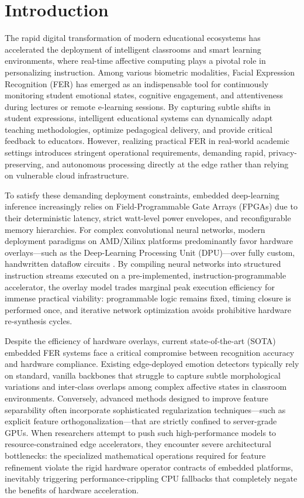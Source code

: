 \documentclass[algorithms,article,submit,moreauthors]{Definitions/mdpi}
\begin{document}
\section{Introduction}\label{sec1}

The rapid digital transformation of modern educational ecosystems has accelerated the deployment of intelligent classrooms and smart learning environments, where real-time affective computing plays a pivotal role in personalizing instruction. Among various biometric modalities, Facial Expression Recognition (FER) has emerged as an indispensable tool for continuously monitoring student emotional states, cognitive engagement, and attentiveness during lectures or remote e-learning sessions. By capturing subtle shifts in student expressions, intelligent educational systems can dynamically adapt teaching methodologies, optimize pedagogical delivery, and provide critical feedback to educators. However, realizing practical FER in real-world academic settings introduces stringent operational requirements, demanding rapid, privacy-preserving, and autonomous processing directly at the edge rather than relying on vulnerable cloud infrastructure.

To satisfy these demanding deployment constraints, embedded deep-learning inference increasingly relies on Field-Programmable Gate Arrays (FPGAs) due to their deterministic latency, strict watt-level power envelopes, and reconfigurable memory hierarchies. For complex convolutional neural networks, modern deployment paradigms on AMD/Xilinx platforms predominantly favor hardware overlays—such as the Deep-Learning Processing Unit (DPU)—over fully custom, handwritten dataflow circuits \citep{bib2,bib1}. By compiling neural networks into structured instruction streams executed on a pre-implemented, instruction-programmable accelerator, the overlay model trades marginal peak execution efficiency for immense practical viability: programmable logic remains fixed, timing closure is performed once, and iterative network optimization avoids prohibitive hardware re-synthesis cycles.

Despite the efficiency of hardware overlays, current state-of-the-art (SOTA) embedded FER systems face a critical compromise between recognition accuracy and hardware compliance. Existing edge-deployed emotion detectors typically rely on standard, vanilla backbones that struggle to capture subtle morphological variations and inter-class overlaps among complex affective states in classroom environments. Conversely, advanced methods designed to improve feature separability often incorporate sophisticated regularization techniques—such as explicit feature orthogonalization—that are strictly confined to server-grade GPUs. When researchers attempt to push such high-performance models to resource-constrained edge accelerators, they encounter severe architectural bottlenecks: the specialized mathematical operations required for feature refinement violate the rigid hardware operator contracts of embedded platforms, inevitably triggering performance-crippling CPU fallbacks that completely negate the benefits of hardware acceleration.
\end{document}
